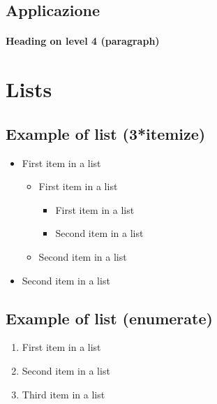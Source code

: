 \documentclass[paper=a4, fontsize=11pt]{scrartcl} %
\numberwithin{equation}{section} %
\numberwithin{figure}{section} %
\numberwithin{table}{section} %
\begin{document}

\subsection{Applicazione}

\lipsum[3] %

\paragraph{Heading on level 4 (paragraph)}

\lipsum[6] %


\section{Lists}


\subsection{Example of list (3*itemize)}
\begin{itemize}
	\item First item in a list
		\begin{itemize}
		\item First item in a list
			\begin{itemize}
			\item First item in a list
			\item Second item in a list
			\end{itemize}
		\item Second item in a list
		\end{itemize}
	\item Second item in a list
\end{itemize}


\subsection{Example of list (enumerate)}
\begin{enumerate}
\item First item in a list
\item Second item in a list
\item Third item in a list
\end{enumerate}

\end{document}
